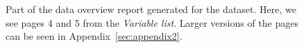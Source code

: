 \documentclass[article,shortnames]{jss}
\begin{document}
\begin{figure}[tb]
\begin{center}
\end{center}
\caption{Part of the data overview report generated for the  dataset. Here, we see pages 4 and 5 from the \textit{Variable list}. Larger versions of the pages can be seen in
  Appendix~\ref{sec:appendix2}.}
\label{fig:bigExampleP45}
\end{figure}
\end{document}
